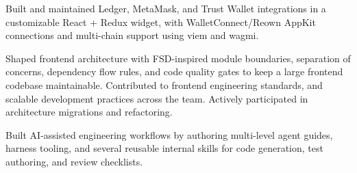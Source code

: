 \begin{cventries}
{\begin{cvitems}
        \item {Built and maintained Ledger, MetaMask, and Trust Wallet integrations in a customizable React + Redux widget, with WalletConnect/Reown AppKit connections and multi-chain support using viem and wagmi.}
        \item {Shaped frontend architecture with FSD-inspired module boundaries, separation of concerns, dependency flow rules, and code quality gates to keep a large frontend codebase maintainable. Contributed to frontend engineering standards, and scalable development practices across the team. Actively participated in architecture migrations and refactoring.}
        \item {Built AI-assisted engineering workflows by authoring multi-level agent guides, harness tooling, and several reusable internal skills for code generation, test authoring, and review checklists.}
      \end{cvitems}
    }
    {\vspace{24pt}}


\end{cventries}

